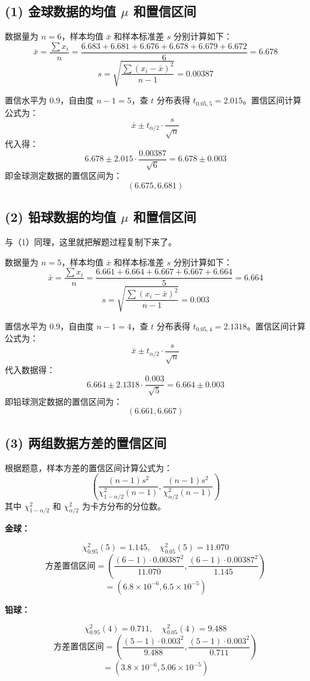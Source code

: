\documentclass[twoside]{article}
\begin{document}
\begin{ans}{17}{17}

    \subsection*{(1) 金球数据的均值 $\mu$ 和置信区间}
    
    数据量为 $n = 6$，样本均值 $\bar{x}$ 和样本标准差 $s$ 分别计算如下：
    \[
    \bar{x} = \frac{\sum x_i}{n} = \frac{6.683 + 6.681 + 6.676 + 6.678 + 6.679 + 6.672}{6} = 6.678
    \]
    \[
    s = \sqrt{\frac{\sum (x_i - \bar{x})^2}{n-1}} = 0.00387
    \]
    
    置信水平为 $0.9$，自由度 $n-1 = 5$，查 $t$ 分布表得 $t_{0.05, 5} = 2.015$。置信区间计算公式为：
    \[
    \bar{x} \pm t_{\alpha/2} \cdot \frac{s}{\sqrt{n}}
    \]
    代入得：
    \[
    6.678 \pm 2.015 \cdot \frac{0.00387}{\sqrt{6}} = 6.678 \pm 0.003
    \]
    即金球测定数据的置信区间为：
    \[
    (6.675, 6.681)
    \]
    
    \subsection*{(2) 铅球数据的均值 $\mu$ 和置信区间}
    
    与（1）同理，这里就把解题过程复制下来了。
    
    数据量为 $n = 5$，样本均值 $\bar{x}$ 和样本标准差 $s$ 分别计算如下：
    \[
    \bar{x} = \frac{\sum x_i}{n} = \frac{6.661 + 6.664 + 6.667 + 6.667 + 6.664}{5} = 6.664
    \]
    \[
    s = \sqrt{\frac{\sum (x_i - \bar{x})^2}{n-1}} = 0.003
    \]
    
    置信水平为 $0.9$，自由度 $n-1 = 4$，查 $t$ 分布表得 $t_{0.05, 4} = 2.1318$。置信区间计算公式为：
    \[
    \bar{x} \pm t_{\alpha/2} \cdot \frac{s}{\sqrt{n}}
    \]
    代入数据得：
    \[
    6.664 \pm 2.1318 \cdot \frac{0.003}{\sqrt{5}} = 6.664 \pm 0.003
    \]
    即铅球测定数据的置信区间为：
    \[
    (6.661, 6.667)
    \]
    
    \subsection*{(3) 两组数据方差的置信区间}
    
    根据题意，样本方差的置信区间计算公式为：
    \[
    \left( \frac{(n-1)s^2}{\chi^2_{1-\alpha/2}(n-1)}, \frac{(n-1)s^2}{\chi^2_{\alpha/2}(n-1)} \right)
    \]
    其中 $\chi^2_{1-\alpha/2}$ 和 $\chi^2_{\alpha/2}$ 为卡方分布的分位数。
    
    \textbf{金球：}

    \[
    \chi^2_{0.95}(5) = 1.145, \quad \chi^2_{0.05}(5) = 11.070
    \]
    \[
    \text{方差置信区间} = \left( \frac{(6-1) \cdot 0.00387^2}{11.070}, \frac{(6-1) \cdot 0.00387^2}{1.145} \right)
    \]
    \[
    = (6.8 \times 10^{-6}, 6.5 \times 10^{-5})
    \]
    
    \textbf{铅球：}

    \[
    \chi^2_{0.95}(4) = 0.711, \quad \chi^2_{0.05}(4) = 9.488
    \]
    \[
    \text{方差置信区间} = \left( \frac{(5-1) \cdot 0.003^2}{9.488}, \frac{(5-1) \cdot 0.003^2}{0.711} \right)
    \]
    \[
    = (3.8 \times 10^{-6}, 5.06 \times 10^{-5})
    \]
\end{ans}
\end{document}
